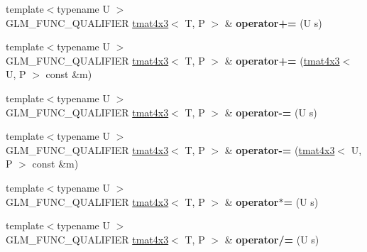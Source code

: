 \begin{DoxyCompactItemize}
\item 
{\footnotesize template$<$typename U $>$ }\\G\+L\+M\+\_\+\+F\+U\+N\+C\+\_\+\+Q\+U\+A\+L\+I\+F\+I\+ER \hyperlink{structglm_1_1detail_1_1tmat4x3}{tmat4x3}$<$ T, P $>$ \& {\bfseries operator+=} (U s)\hypertarget{structglm_1_1detail_1_1tmat4x3_a4ad2b7cf1ca8473d377b1a6bfbdb7f53}{}\label{structglm_1_1detail_1_1tmat4x3_a4ad2b7cf1ca8473d377b1a6bfbdb7f53}

\item 
{\footnotesize template$<$typename U $>$ }\\G\+L\+M\+\_\+\+F\+U\+N\+C\+\_\+\+Q\+U\+A\+L\+I\+F\+I\+ER \hyperlink{structglm_1_1detail_1_1tmat4x3}{tmat4x3}$<$ T, P $>$ \& {\bfseries operator+=} (\hyperlink{structglm_1_1detail_1_1tmat4x3}{tmat4x3}$<$ U, P $>$ const \&m)\hypertarget{structglm_1_1detail_1_1tmat4x3_af8c2c8f9977ae873d3c26b5027363fcf}{}\label{structglm_1_1detail_1_1tmat4x3_af8c2c8f9977ae873d3c26b5027363fcf}

\item 
{\footnotesize template$<$typename U $>$ }\\G\+L\+M\+\_\+\+F\+U\+N\+C\+\_\+\+Q\+U\+A\+L\+I\+F\+I\+ER \hyperlink{structglm_1_1detail_1_1tmat4x3}{tmat4x3}$<$ T, P $>$ \& {\bfseries operator-\/=} (U s)\hypertarget{structglm_1_1detail_1_1tmat4x3_af3a1782be12d9d822cc6fc21b94fe319}{}\label{structglm_1_1detail_1_1tmat4x3_af3a1782be12d9d822cc6fc21b94fe319}

\item 
{\footnotesize template$<$typename U $>$ }\\G\+L\+M\+\_\+\+F\+U\+N\+C\+\_\+\+Q\+U\+A\+L\+I\+F\+I\+ER \hyperlink{structglm_1_1detail_1_1tmat4x3}{tmat4x3}$<$ T, P $>$ \& {\bfseries operator-\/=} (\hyperlink{structglm_1_1detail_1_1tmat4x3}{tmat4x3}$<$ U, P $>$ const \&m)\hypertarget{structglm_1_1detail_1_1tmat4x3_ae99d5b3f57c8ba0e43b95d50c3652e14}{}\label{structglm_1_1detail_1_1tmat4x3_ae99d5b3f57c8ba0e43b95d50c3652e14}

\item 
{\footnotesize template$<$typename U $>$ }\\G\+L\+M\+\_\+\+F\+U\+N\+C\+\_\+\+Q\+U\+A\+L\+I\+F\+I\+ER \hyperlink{structglm_1_1detail_1_1tmat4x3}{tmat4x3}$<$ T, P $>$ \& {\bfseries operator$\ast$=} (U s)\hypertarget{structglm_1_1detail_1_1tmat4x3_a2a6ffe1017bd2b4d1b74d45d8d90e90e}{}\label{structglm_1_1detail_1_1tmat4x3_a2a6ffe1017bd2b4d1b74d45d8d90e90e}

\item 
{\footnotesize template$<$typename U $>$ }\\G\+L\+M\+\_\+\+F\+U\+N\+C\+\_\+\+Q\+U\+A\+L\+I\+F\+I\+ER \hyperlink{structglm_1_1detail_1_1tmat4x3}{tmat4x3}$<$ T, P $>$ \& {\bfseries operator/=} (U s)\hypertarget{structglm_1_1detail_1_1tmat4x3_a990634b567ee79dbd2cfc3ea469e57fb}{}\label{structglm_1_1detail_1_1tmat4x3_a990634b567ee79dbd2cfc3ea469e57fb}

\end{DoxyCompactItemize}

